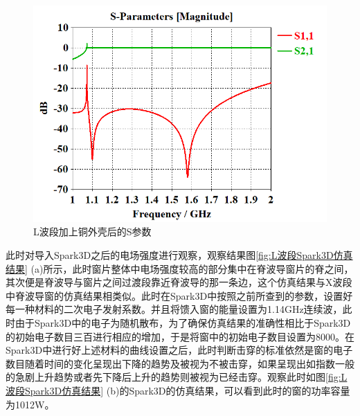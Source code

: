 \documentclass[master]{thesis-uestc}
\begin{document}
\begin{figure}[!htb]
    \centering
    \includegraphics[width=0.45\linewidth]{pic/chapter4/L波段加上铜外壳后的S参数.png}
    \caption{L波段加上铜外壳后的S参数}
    \label{fig:L波段加上铜外壳后的S参数}
\end{figure}

此时对导入Spark3D之后的电场强度进行观察，观察结果图\ref{fig:L波段Spark3D仿真结果} (a)所示，此时窗片整体中电场强度较高的部分集中在脊波导窗片的脊之间，其次便是脊波导与窗片之间过渡段靠近脊波导的那一条边，这个仿真结果与X波段中脊波导窗的仿真结果相类似。此时在Spark3D中按照之前所查到的参数，设置好每一种材料的二次电子发射系数。并且将馈入窗的能量设置为1.14GHz连续波，此时由于Spark3D中的电子为随机散布，为了确保仿真结果的准确性相比于Spark3D的初始电子数目三百进行相应的增加，于是将窗中的初始电子数目设置为8000。在Spark3D中进行好上述材料的曲线设置之后，此时判断击穿的标准依然是窗的电子数目随着时间的变化呈现出下降的趋势及被视为不被击穿，如果呈现出如指数一般的急剧上升趋势或者先下降后上升的趋势则被视为已经击穿。观察此时如图\ref{fig:L波段Spark3D仿真结果} (b)的Spark3D的仿真结果，可以看到此时的窗的功率容量为1012W。
\end{document}
